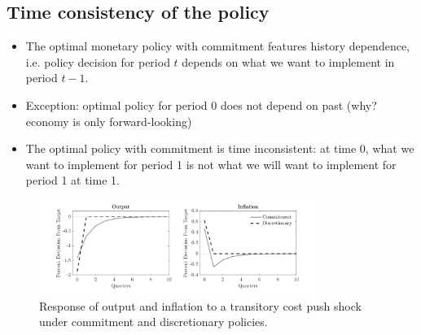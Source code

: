 \subsection{Time consistency of the policy}
\begin{itemize}
    \item The optimal monetary policy with commitment features
    history dependence, i.e. policy decision for period $t$ depends
    on what we want to implement in period $t-1$.
    \item Exception: optimal policy for period 0 does not depend on
    past (why? economy is only forward-looking)
    \item The optimal policy with commitment is time inconsistent:
    at time 0, what we want to implement for period 1 is not what 
    we will want to implement for period 1 at time 1.
\end{itemize}

\begin{figure}[!htbp]
    \centering
    \includegraphics[width=0.8\textwidth]{figures/OptPolicy.png}
    \caption{Response of output and inflation to a transitory cost push shock
    under commitment and discretionary policies.}
    \label{fig:241111_1}
\end{figure}

